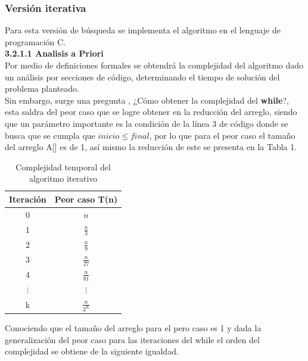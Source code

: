 \documentclass[12pt,twoside]{article}
\begin{document}
            \subsubsection{\large Versi\'on iterativa}
            Para esta versi\'on de b\'usqueda se implementa el algoritmo en el lenguaje de programaci\'on C.\\[0.5cm] 
                {\bf 3.2.1.1 Analisis a Priori}\\[0.2cm]
                Por medio de definiciones formales se obtendr\'a la complejidad del algoritmo dado un an\'alisis por secciones de c\'odigo, determinando el tiempo de soluci\'on del problema planteado.\\
               Sin embargo, surge una pregunta , ¿C\'omo obtener la complejidad del {\bf while}?, esta saldra del peor caso que se logre obtener en la reducci\'on del arreglo, siendo que un par\'ametro importante es la condici\'on de la l\'inea 3 de c\'odigo donde se busca que se cumpla que {$inicio\leq final$}, por lo que para el peor caso el tama\~no del arreglo A[] es de 1, así mismo la reducci\'on de este se presenta en la Tabla 1.
               \begin{longtable}{||c|c||}
                    \caption{Complejidad temporal del algoritmo iterativo}\\
                        \hline
                            \textbf{Iteraci\'on}&\textbf{Peor caso T(n)}\\
                         \hline
                            {0}&{$n$}\\
                        \hline
                            {1}&{$\frac{n}{3}$}\\
                        \hline
                            {2}&{$\frac{n}{9}$}\\
                        \hline
                            {3}&{$\frac{n}{27}$}\\
                        \hline
                            {4}&{$\frac{n}{81}$}\\
                        \hline
                            {$\vdots$}&{$\vdots$}\\
                        \hline
                            {k}&{$\frac{n}{3^{K}}$}\\
                        \hline
                \end{longtable}
                Conociendo que el tama\~no del arreglo para el pero caso es 1 y dada la generalizaci\'on del peor caso para las iteraciones del while el orden del complejidad se obtiene de la siguiente igualdad.
\end{document}
